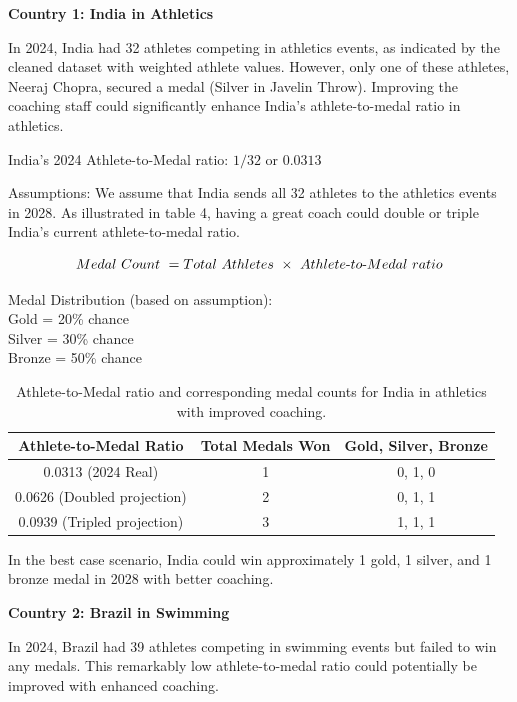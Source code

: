 \documentclass{mcmthesis}
\begin{document}
\textbf{Country 1: India in Athletics}

In 2024, India had 32 athletes competing in athletics events, as indicated by the cleaned dataset with weighted athlete values. However, only one of these athletes, Neeraj Chopra, secured a medal (Silver in Javelin Throw). Improving the coaching staff could significantly enhance India's athlete-to-medal ratio in athletics.

India's 2024 Athlete-to-Medal ratio: $1/32$ or $0.0313$

Assumptions: We assume that India sends all 32 athletes to the athletics events in 2028. As illustrated in table 4, having a great coach could double or triple India's current athlete-to-medal ratio. 

\begin{equation}
    Medal\ Count \ = Total\ Athletes\ \times \ Athlete \textnormal- to \textnormal- Medal\ ratio
\end{equation}

\begin{center}
Medal Distribution (based on assumption): \\
Gold = 20\% chance \\
Silver = 30\% chance \\
Bronze = 50\% chance
\end{center}

\begin{table}[H]
\centering
\begin{tabular}{|c|c|c|}
\hline
\textbf{Athlete-to-Medal Ratio} & \textbf{Total Medals Won} & \textbf{Gold, Silver, Bronze} \\ \hline
0.0313 (2024 Real) & 1 & 0, 1, 0 \\ \hline
0.0626 (Doubled projection)   & 2 & 0, 1, 1 \\ \hline
0.0939 (Tripled projection)   & 3 & 1, 1, 1 \\ \hline
\end{tabular}
\caption{Athlete-to-Medal ratio and corresponding medal counts for India in athletics with improved coaching.}
\label{tab:athlete_medal_ratio}
\end{table}
In the best case scenario, India could win approximately 1 gold, 1 silver, and 1 bronze medal in 2028 with better coaching. 

\textbf{Country 2: Brazil in Swimming}

In 2024, Brazil had 39 athletes competing in swimming events but failed to win any medals. This remarkably low athlete-to-medal ratio could potentially be improved with enhanced coaching.
\end{document}
